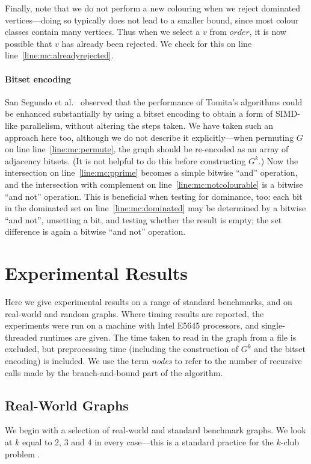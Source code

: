 \documentclass[letterpaper]{article}
\newcommand{\mcline}[1]{line~\ref{line:mc:#1}}
\newcommand{\order}{\mathit{order}}
\begin{document}
Finally, note that we do not perform a new colouring when we reject dominated vertices---doing so
typically does not lead to a smaller bound, since most colour classes contain many vertices. Thus
when we select a $v$ from $\order$, it is now possible that $v$ has already been rejected. We check
for this on line \mcline{alreadyrejected}.

\paragraph{Bitset encoding} San Segundo et al.\ \cite{SanSegundo:2011,SanSegundo:2013} observed that
the performance of Tomita's algorithms could be enhanced substantially by using a bitset encoding to
obtain a form of SIMD-like parallelism, without altering the steps taken. We have taken such an
approach here too, although we do not describe it explicitly---when permuting $G$ on line
\mcline{permute}, the graph should be re-encoded as an array of adjacency bitsets. (It is not
helpful to do this before constructing $G^k$.) Now the intersection on \mcline{pprime} becomes a
simple bitwise ``and'' operation, and the intersection with complement on \mcline{notcolourable} is
a bitwise ``and not'' operation. This is beneficial when testing for dominance, too: each bit in the
dominated set on \mcline{dominated} may be determined by a bitwise ``and not'', unsetting a bit, and
testing whether the result is empty; the set difference is again a bitwise ``and not'' operation.

\section{Experimental Results}

Here we give experimental results on a range of standard benchmarks, and on real-world and random
graphs. Where timing results are reported, the experiments were run on a machine with Intel E5645
processors, and single-threaded runtimes are given. The time taken to read in the graph from a file
is excluded, but preprocessing time (including the construction of $G^k$ and the bitset encoding) is
included. We use the term \emph{nodes} to refer to the number of recursive calls made by the
branch-and-bound part of the algorithm.

\subsection{Real-World Graphs}

We begin with a selection of real-world and standard benchmark graphs. We look at $k$ equal to 2, 3
and 4 in every case---this is a standard practice for the $k$-club problem
\cite{Chang:2013,Wotzlaw:2014}.
\end{document}
